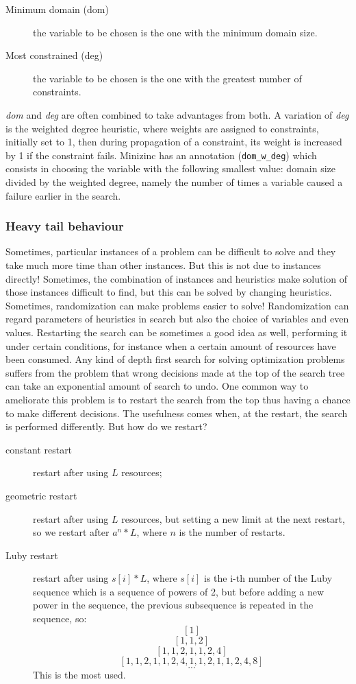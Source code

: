 \documentclass[10pt,a4paper]{article}
\begin{document}
\begin{description}
    \item[Minimum domain (dom)] the variable to be chosen is the one with the
    minimum domain size.
    \item[Most constrained (deg)] the variable to be chosen is the one with the
    greatest number of constraints.
\end{description}
\textit{dom} and \textit{deg} are often combined to take advantages from both.
A variation of \textit{deg} is the weighted degree heuristic, where weights are
assigned to constraints, initially set to 1, then during propagation of a
constraint, its weight is increased by 1 if the constraint fails. Minizinc has
an annotation (\texttt{dom\_w\_deg}) which consists in choosing the variable with
the following smallest value: domain size divided by the weighted degree, namely
the number of times a variable caused a failure earlier in the search.

\subsubsection{Heavy tail behaviour}
Sometimes, particular instances of a problem can be difficult to solve and they
take much more time than other instances. But this is not due to instances
directly! Sometimes, the combination of instances and heuristics make solution
of those instances difficult to find, but this can be solved by changing
heuristics. Sometimes, randomization can make problems easier to solve!
Randomization can regard parameters of heuristics in search but also the
choice of variables and even values. Restarting the search can be sometimes a
good idea as well, performing it under certain conditions, for instance when a
certain amount of resources have been consumed. Any kind of depth first search
for solving optimization problems suffers from the problem that wrong decisions
made at the top of the search tree can take an exponential amount of search to
undo. One common way to ameliorate this problem is to restart the search from
the top thus having a chance to make different decisions. The usefulness comes
when, at the restart, the search is performed differently. But how do we
restart?

\begin{description}
    \item[constant restart] restart after using $L$ resources;
    \item[geometric restart] restart after using $L$ resources, but setting a
    new limit at the next restart, so we restart after $a^n*L$, where $n$ is the
    number of restarts.
    \item[Luby restart] restart after using $s[i]*L$, where $s[i]$ is the i-th
    number of the Luby sequence which is a sequence of powers of 2, but before
    adding a new power in the sequence, the previous subsequence is repeated in
    the sequence, so:
    \[ [1] \]
    \[ [1, 1, 2] \]
    \[ [1, 1, 2, 1, 1, 2, 4] \]
    \[ [1, 1, 2, 1, 1, 2, 4, 1, 1, 2, 1, 1, 2, 4, 8] \]
    \[ ... \]
    This is the most used.
\end{description}
\end{document}
